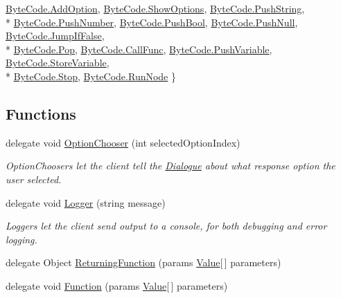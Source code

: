 \begin{DoxyCompactItemize}
\hyperlink{a00050_ad5dfb6ee68ca7469623ad3e459f98894a0e6a6b9eb32a4d55f277d45eff74250d}{Byte\-Code.\-Add\-Option}, 
\hyperlink{a00050_ad5dfb6ee68ca7469623ad3e459f98894a658963e1a47a5018fd1e6fbc2af804f7}{Byte\-Code.\-Show\-Options}, 
\hyperlink{a00050_ad5dfb6ee68ca7469623ad3e459f98894a3e7800d36ccb7bfe6c463bbe7db7e41a}{Byte\-Code.\-Push\-String}, 
\\*
\hyperlink{a00050_ad5dfb6ee68ca7469623ad3e459f98894a29c8f5d9d5088ada190ccd9c21c31f33}{Byte\-Code.\-Push\-Number}, 
\hyperlink{a00050_ad5dfb6ee68ca7469623ad3e459f98894af698d0b66ccf00f7d362c039949d1b80}{Byte\-Code.\-Push\-Bool}, 
\hyperlink{a00050_ad5dfb6ee68ca7469623ad3e459f98894acf728db6b8e47e735666156aec7ae755}{Byte\-Code.\-Push\-Null}, 
\hyperlink{a00050_ad5dfb6ee68ca7469623ad3e459f98894af8bbf32f00c942d974ade428e24b021f}{Byte\-Code.\-Jump\-If\-False}, 
\\*
\hyperlink{a00050_ad5dfb6ee68ca7469623ad3e459f98894a0ae61bd0474e04c9f1195d4baa0213a0}{Byte\-Code.\-Pop}, 
\hyperlink{a00050_ad5dfb6ee68ca7469623ad3e459f98894a3b5e7e8300dc6e4b78cb865c5b10f01a}{Byte\-Code.\-Call\-Func}, 
\hyperlink{a00050_ad5dfb6ee68ca7469623ad3e459f98894ab8c46f65015a178516fadbb5ad6c2038}{Byte\-Code.\-Push\-Variable}, 
\hyperlink{a00050_ad5dfb6ee68ca7469623ad3e459f98894a872dc050abaff4beb46e70dadd4088c2}{Byte\-Code.\-Store\-Variable}, 
\\*
\hyperlink{a00050_ad5dfb6ee68ca7469623ad3e459f98894a11a755d598c0c417f9a36758c3da7481}{Byte\-Code.\-Stop}, 
\hyperlink{a00050_ad5dfb6ee68ca7469623ad3e459f98894ae956bcf888278c168ee9b106927ff6ac}{Byte\-Code.\-Run\-Node}
 \}
\end{DoxyCompactItemize}
\subsection*{Functions}
\begin{DoxyCompactItemize}
\item 
delegate void \hyperlink{a00050_a39866cbb03c03a35805d598b5d4ad553}{Option\-Chooser} (int selected\-Option\-Index)
\begin{DoxyCompactList}\small\item\em Option\-Choosers let the client tell the \hyperlink{a00090}{Dialogue} about what response option the user selected. \end{DoxyCompactList}\item 
delegate void \hyperlink{a00050_a1e50031b945a3a2afafee6f590730568}{Logger} (string message)
\begin{DoxyCompactList}\small\item\em Loggers let the client send output to a console, for both debugging and error logging. \end{DoxyCompactList}\item 
delegate Object \hyperlink{a00050_a5177bf74fbfe7303fac9d8236c2e514b}{Returning\-Function} (params \hyperlink{a00167}{Value}\mbox{[}$\,$\mbox{]} parameters)
\item 
delegate void \hyperlink{a00050_ae0be2e5cf13d5779816102439e61ff1a}{Function} (params \hyperlink{a00167}{Value}\mbox{[}$\,$\mbox{]} parameters)
\end{DoxyCompactItemize}


